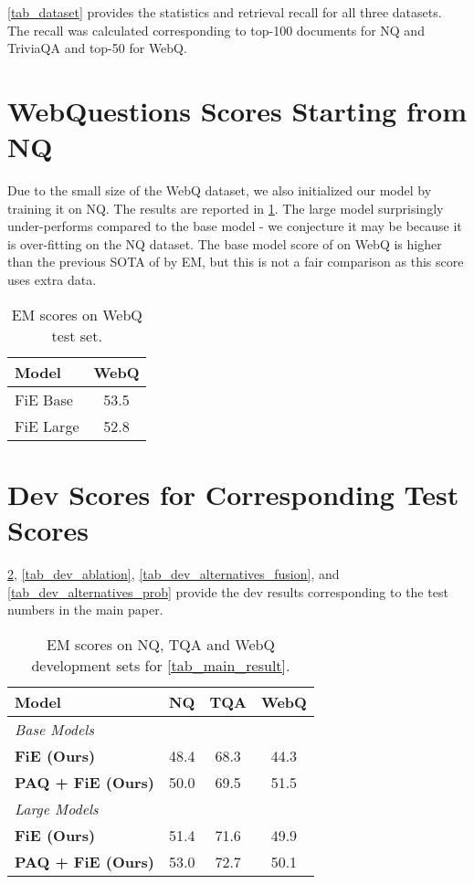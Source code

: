 \documentclass[11pt]{article}
\begin{document}
\cref{tab_dataset} provides the statistics and retrieval recall for all three datasets. The recall was calculated corresponding to top-100 documents for NQ and TriviaQA and top-50 for WebQ.


\section{WebQuestions Scores Starting from NQ}

Due to the small size of the WebQ dataset, we also initialized our model by training it on NQ. The results are reported in \cref{tab_sup_webq}. The large model surprisingly under-performs compared to the base model - we conjecture it may be because it is over-fitting on the NQ dataset. The base model score of  on WebQ is  higher than the previous SOTA of  by  EM, but this is not a fair comparison as this score uses extra data.

\begin{table}[h!]
\begin{center}
\begin{tabular}{lc}
\toprule
\textbf{Model} & \textbf{WebQ}\\ 
\toprule
FiE Base & 53.5 \\
FiE Large & 52.8 \\
\bottomrule
\end{tabular}
\end{center}
\caption{EM scores on WebQ test set.}
\label{tab_sup_webq}
\end{table}


\section{Dev Scores for Corresponding Test Scores}
\cref{tab_dev_main_result}, \cref{tab_dev_ablation}, \cref{tab_dev_alternatives_fusion}, and  \cref{tab_dev_alternatives_prob} provide the dev results corresponding to the test numbers in the main paper.

\begin{table}[h!]
\begin{center}
\begin{tabular}{lccc}
\toprule
\textbf{Model} & \textbf{NQ}  & \textbf{TQA}  & \textbf{WebQ}\\ 
\toprule 
\multicolumn{4}{l}{\textit{Base Models}} \\
\textbf{FiE (Ours)} & 48.4 & 68.3  & 44.3 \\
\textbf{PAQ + FiE (Ours)}  & 50.0 & 69.5  & 51.5 \\
\midrule 
\multicolumn{4}{l}{\textit{Large Models}} \\
\textbf{FiE (Ours)}  & 51.4 & 71.6 & 49.9 \\
\textbf{PAQ + FiE (Ours)}  & 53.0 & 72.7 & 50.1 \\
\bottomrule
\end{tabular}
\end{center}
\caption{EM scores on NQ, TQA and WebQ development sets for \cref{tab_main_result}.}
\label{tab_dev_main_result}
\end{table}
\end{document}
